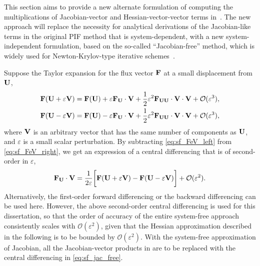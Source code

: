 This section aims to provide a new alternate formulation of computing
the multiplications of Jacobian-vector and Hessian-vector-vector terms in~.
The new approach will replace the necessity for analytical derivations
of the Jacobian-like terms in the original PIF method that is system-dependent,
with a new system-independent formulation, based on the so-called ``Jacobian-free'' method,
which is widely used for Newton-Krylov-type
iterative schemes~\cite{gear1983iterative,brown1990hybrid,knoll2004jacobian,knoll2011application}.

Suppose the Taylor expansion for the flux vector \( \mathbf{F} \) at a small displacement from \( \mathbf{U} \),
\begin{subequations}\label{eq:sf_FeV}
    \begin{align}
        \label{eq:sf_FeV_right}\mathbf{F} ( \mathbf{U} + \varepsilon \mathbf{V}) =
        \mathbf{F}(\mathbf{U}) + \varepsilon \mathbf{F}_{\mathbf{U}} \cdot \mathbf{V} +
        \frac{1}{2} \varepsilon^{2} \mathbf{F}_{\mathbf{U}\mathbf{U}} \cdot \mathbf{V} \cdot \mathbf{V} + \mathcal{O}(\varepsilon^{3}), \\
        \label{eq:sf_FeV_left}\mathbf{F} ( \mathbf{U} - \varepsilon \mathbf{V}) =
        \mathbf{F}(\mathbf{U}) - \varepsilon \mathbf{F}_{\mathbf{U}} \cdot \mathbf{V} +
        \frac{1}{2} \varepsilon^{2} \mathbf{F}_{\mathbf{U}\mathbf{U}} \cdot \mathbf{V} \cdot \mathbf{V} + \mathcal{O}(\varepsilon^{3}),
    \end{align}
\end{subequations}
where \( \mathbf{V} \) is an arbitrary vector that has
the same number of components as \( \mathbf{U} \), and \( \varepsilon \) is a
small scalar perturbation.
By subtracting \cref{eq:sf_FeV_left} from \cref{eq:sf_FeV_right},
we get an expression of a central differencing that is of second-order in $\varepsilon$,
\begin{equation}\label{eq:sf_jac_free}
    \mathbf{F}_{\mathbf{U}} \cdot \mathbf{V} = \frac{1}{2\varepsilon}
    \bigg[ \mathbf{F}(\mathbf{U} + \varepsilon \mathbf{V}) -\mathbf{F}(\mathbf{U} - \varepsilon \mathbf{V}) \bigg]
    + \mathcal{O} ( \varepsilon^{2} ).
\end{equation}
Alternatively, the first-order forward differencing or the backward differencing can be used here.
However, the above second-order central differencing is used for this dissertation,
so that the order of accuracy of the entire system-free approach consistently scales with \( \mathcal{O}(\varepsilon^{2}) \),
given that the Hessian approximation described in the following is to be bounded by \( \mathcal{O}(\varepsilon^{2}) \).
With the system-free approximation of Jacobian, all the Jacobian-vector products in 
are to be replaced with the central differencing in \cref{eq:sf_jac_free}.

